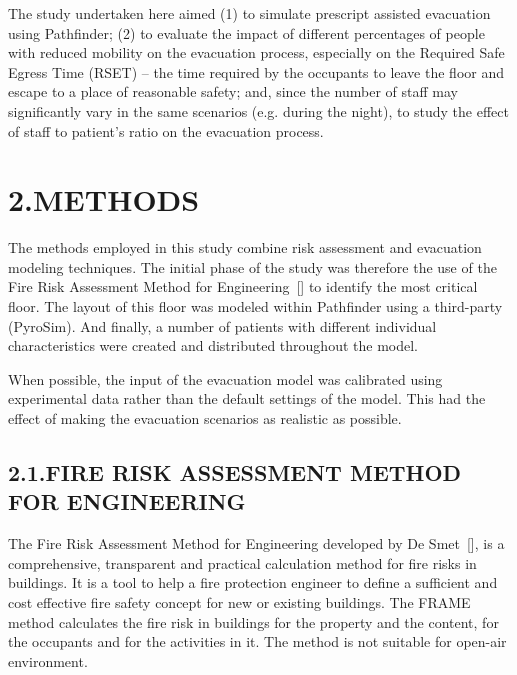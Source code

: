 \documentclass{style/llncs}
\begin{document}
The study undertaken here aimed (1) to simulate prescript assisted
evacuation using Pathfinder; (2) to evaluate the impact of different
percentages of people with reduced mobility on the evacuation process,
especially on the Required Safe Egress Time (RSET) – the time required by
the occupants to leave the floor and escape to a place of reasonable
safety; and, since the number of staff may significantly vary in the same
scenarios (e.g. during the night), to study the effect of staff to
patient's ratio on the evacuation process.%

\section{2.\hspace*{0.5em}METHODS}\label{sec-methods}%

\noindent{}The methods employed in this study combine risk assessment
and evacuation modeling techniques. The initial phase of the study was
therefore the use of the Fire Risk Assessment Method for Engineering~[]
to identify the most critical floor. The layout of this floor was modeled
within Pathfinder using a third-party (PyroSim). And finally, a number of
patients with different individual characteristics were created and
distributed throughout the model.%

When possible, the input of the evacuation model was calibrated using
experimental data rather than the default settings of the model. This had
the effect of making the evacuation scenarios as realistic as possible.%

\subsection{2.1.\hspace*{0.5em}FIRE RISK ASSESSMENT METHOD FOR ENGINEERING}\label{sec-fire-risk-assessment-method-for-engineering}%

\noindent{}The Fire Risk Assessment Method for Engineering developed by De
Smet~[], is a comprehensive, transparent and practical calculation
method for fire risks in buildings. It is a tool to help a fire
protection engineer to define a sufficient and cost effective fire safety
concept for new or existing buildings. The FRAME method calculates the
fire risk in buildings for the property and the content, for the
occupants and for the activities in it. The method is not suitable for
open-air environment.%
\end{document}
